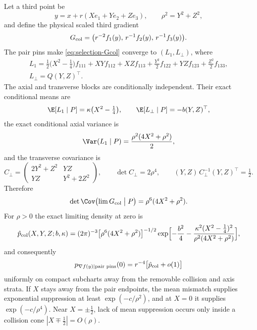 \begin{lemma}\label{lem:selection-collarchart}
Let a third point be
\begin{equation}\label{eq:selection-collarpt}
y=x+r(Xe_1+Ye_2+Ze_3),\qquad\rho^2=Y^2+Z^2,
\end{equation}
and define the physical scaled third gradient
\begin{equation}\label{eq:selection-Gcol}
G_{\rm col}=\bigl(r^{-2}f_1(y),\,r^{-1}f_2(y),\,r^{-1}f_3(y)\bigr).
\end{equation}
The pair pins make \eqref{eq:selection-Gcol} converge to $(L_1,L_\perp)$, where
\begin{gather}
L_1=\tfrac12\bigl(X^2-\tfrac14\bigr)f_{111}+XYf_{112}+XZf_{113}+\tfrac{Y^2}2f_{122}+YZf_{123}+\tfrac{Z^2}2f_{133},\label{eq:selection-L1}\\
L_\perp=Q(Y,Z)^{\top}.\label{eq:selection-Lperp}
\end{gather}
The axial and transverse blocks are conditionally independent. Their exact conditional means are
\begin{equation}\label{eq:selection-colmeans}
\E[L_1\mid P]=\kappa\bigl(X^2-\tfrac14\bigr),\qquad\E[L_\perp\mid P]=-b(Y,Z)^{\top},
\end{equation}
the exact conditional axial variance is
\begin{equation}\label{eq:selection-colvar}
\Var(L_1\mid P)=\frac{\rho^2(4X^2+\rho^2)}2,
\end{equation}
and the transverse covariance is
\begin{equation}\label{eq:selection-Cperp}
C_\perp=\begin{pmatrix}2Y^2+Z^2&YZ\\YZ&Y^2+2Z^2\end{pmatrix},\qquad\det C_\perp=2\rho^4,\qquad(Y,Z)\,C_\perp^{-1}(Y,Z)^{\top}=\tfrac12 .
\end{equation}
Therefore
\begin{equation}\label{eq:selection-coldet}
\det\Cov\bigl(\lim G_{\rm col}\bigm|P\bigr)=\rho^6(4X^2+\rho^2).
\end{equation}
For $\rho>0$ the exact limiting density at zero is
\begin{equation}\label{eq:selection-coldens}
\hat p_{\rm col}(X,Y,Z;b,\kappa)=(2\pi)^{-3}\bigl[\rho^6(4X^2+\rho^2)\bigr]^{-1/2}\exp\Bigl[-\frac{b^2}4-\frac{\kappa^2(X^2-\frac14)^2}{\rho^2(4X^2+\rho^2)}\Bigr],
\end{equation}
and consequently
\begin{equation}\label{eq:selection-colscale}
p_{\nabla f(y)\mid\text{pair pins}}(0)=r^{-4}\bigl[\hat p_{\rm col}+o(1)\bigr]
\end{equation}
uniformly on compact subcharts away from the removable collision and axis strata. If $X$ stays away from the pair endpoints, the mean mismatch supplies exponential suppression at least $\exp(-c/\rho^2)$, and at $X=0$ it supplies $\exp(-c/\rho^4)$. Near $X=\pm\frac12$, lack of mean suppression occurs only inside a collision cone $|X\mp\frac12|=O(\rho)$.
\end{lemma}

